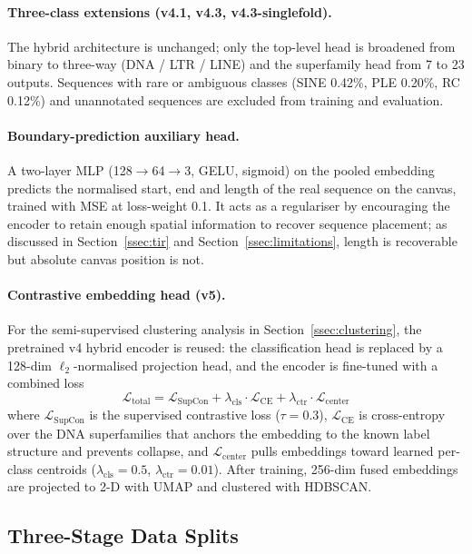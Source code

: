 \documentclass[12pt]{article}
\begin{document}
\paragraph{Three-class extensions (v4.1, v4.3, v4.3-singlefold).} The hybrid architecture is unchanged; only the top-level head is broadened from binary to three-way (DNA / LTR / LINE) and the superfamily head from 7 to 23 outputs. Sequences with rare or ambiguous classes (SINE 0.42\%, PLE 0.20\%, RC 0.12\%) and unannotated sequences are excluded from training and evaluation. 

\paragraph{Boundary-prediction auxiliary head.} A two-layer MLP (128$\to$64$\to$3, GELU, sigmoid) on the pooled embedding predicts the normalised start, end and length of the real sequence on the canvas, trained with MSE at loss-weight 0.1. It acts as a regulariser by encouraging the encoder to retain enough spatial information to recover sequence placement; as discussed in Section~\ref{ssec:tir} and Section~\ref{ssec:limitations}, length is recoverable but absolute canvas position is not.

\paragraph{Contrastive embedding head (v5).} For the semi-supervised clustering analysis in Section~\ref{ssec:clustering}, the pretrained v4 hybrid encoder is reused: the classification head is replaced by a 128-dim $\ell_2$-normalised projection head, and the encoder is fine-tuned with a combined loss
\[
\mathcal{L}_{\text{total}} = \mathcal{L}_{\text{SupCon}} + \lambda_{\text{cls}} \cdot \mathcal{L}_{\text{CE}} + \lambda_{\text{ctr}} \cdot \mathcal{L}_{\text{center}}
\]
where $\mathcal{L}_{\text{SupCon}}$ is the supervised contrastive loss \cite{khosla2020supervised} ($\tau = 0.3$), $\mathcal{L}_{\text{CE}}$ is cross-entropy over the DNA superfamilies that anchors the embedding to the known label structure and prevents collapse, and $\mathcal{L}_{\text{center}}$ pulls embeddings toward learned per-class centroids ($\lambda_{\text{cls}} = 0.5$, $\lambda_{\text{ctr}} = 0.01$). After training, 256-dim fused embeddings are projected to 2-D with UMAP and clustered with HDBSCAN.

\subsection{Three-Stage Data Splits}\label{ssec:splits}
\end{document}
